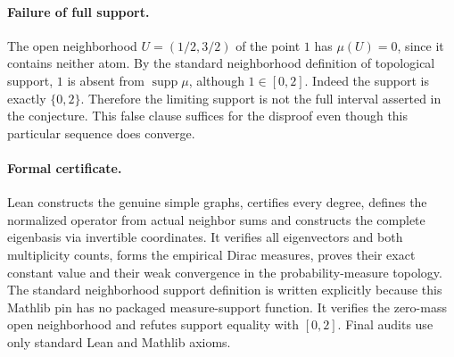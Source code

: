 \documentclass[11pt]{article}
\begin{document}
\paragraph{Failure of full support.}
The open neighborhood $U=(1/2,3/2)$ of the point $1$ has
$\mu(U)=0$, since it contains neither atom. By the standard
neighborhood definition of topological support, $1$ is absent
from $\operatorname{supp}\mu$, although $1\in[0,2]$.
Indeed the support is exactly $\{0,2\}$. Therefore the limiting
support is not the full interval asserted in the conjecture.
This false clause suffices for the disproof even though this
particular sequence does converge.

\paragraph{Formal certificate.}
Lean constructs the genuine simple graphs, certifies every degree,
defines the normalized operator from actual neighbor sums and
constructs the complete eigenbasis via invertible coordinates.
It verifies all eigenvectors and both multiplicity counts, forms
the empirical Dirac measures, proves their exact constant value
and their weak convergence in the probability-measure topology.
The standard neighborhood support definition is written explicitly
because this Mathlib pin has no packaged measure-support function.
It verifies the zero-mass open neighborhood and refutes support
equality with $[0,2]$. Final audits use only standard Lean and
Mathlib axioms.
\end{document}
